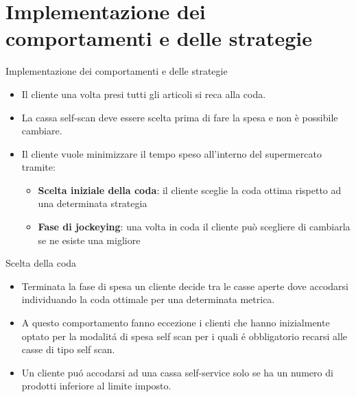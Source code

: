 \section{Implementazione dei comportamenti e delle strategie}





\begin{frame}{Implementazione dei comportamenti e delle strategie}
	\begin{itemize}
		\item Il cliente una volta presi tutti gli articoli si reca alla coda.
		\item La cassa self-scan deve essere scelta prima di fare la spesa e non è possibile cambiare.
		\item Il cliente vuole minimizzare il tempo speso all'interno del supermercato tramite:
		\begin{itemize}
			\item \textbf{Scelta iniziale della coda}: il cliente sceglie la coda ottima rispetto ad una determinata strategia
			\item \textbf{Fase di jockeying}: una volta in coda il cliente può scegliere di cambiarla se ne esiste una migliore
		\end{itemize}
	\end{itemize}
\end{frame}


\begin{frame}{Scelta della coda}
  \centering

  \begin{itemize}
  \item Terminata la fase di spesa un cliente decide tra le casse
    aperte dove accodarsi individuando la coda ottimale per una
    determinata metrica.

  \item A questo comportamento fanno eccezione i clienti che hanno
    inizialmente optato per la modalitá di spesa self scan per i quali
    é obbligatorio recarsi alle casse di tipo self scan.

  \item Un cliente puó accodarsi ad una cassa self-service solo se ha
    un numero di prodotti inferiore al limite imposto.
  \end{itemize}
\end{frame}


